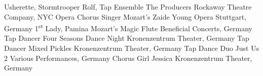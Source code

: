 \begin{cventries}
  \cventrytabb %
    {Usherette, Stormtrooper Rolf, Tap Ensemble}%
    {The Producers}%
    {Rockaway Theatre Company, NYC}%
    {} %
  \cventrytab
    {Opera Chorus Singer}%
    {Mozart's Zaide}%
    {Young Opera Stuttgart, Germany}%
    {}
  \cventrytab
    {1\textsuperscript{st} Lady, Pamina}
    {Mozart's Magic Flute}
    {Beneficial Concerts, Germany}
    {}
  \cventrytab
    {Tap Dancer}
    {Four Seasons Dance Night}
    {Kronenzentrum Theater, Germany}
    {} 
  \cventrytab
    {Tap Dancer}
    {Mixed Pickles}
    {Kronenzentrum Theater, Germany}
    {}
  \cventrytab
    {Tap Dance Duo}
    {Just Us 2}
    {Various Performances, Germany}
    {}
  \cventrytab
    {Chorus Girl}
    {Jessica}
    {Kronenzentrum Theater, Germany}
    {}
\end{cventries}
